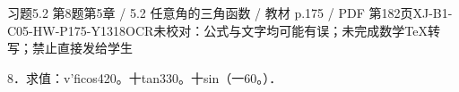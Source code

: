 \begin{bankitem}{习题5.2 第8题}{第5章 / 5.2 任意角的三角函数 / 教材 p.175 / PDF 第182页}{XJ-B1-C05-HW-P175-Y1318}{OCR未校对：公式与文字均可能有误；未完成数学TeX转写；禁止直接发给学生}
\begin{ocrdraft}
\par
8．求值：v'ficos420。十tan330。十sin（一60。）．
\end{ocrdraft}
\end{bankitem}

